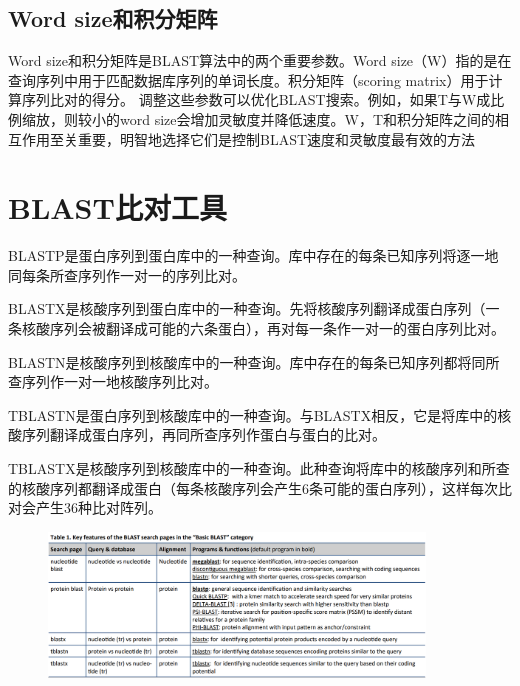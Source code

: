 \subsection{Word size和积分矩阵}
Word size和积分矩阵是BLAST算法中的两个重要参数。Word size（W）指的是在查询序列中用于匹配数据库序列的单词长度。积分矩阵（scoring matrix）用于计算序列比对的得分。
调整这些参数可以优化BLAST搜索。例如，如果T与W成比例缩放，则较小的word size会增加灵敏度并降低速度。W，T和积分矩阵之间的相互作用至关重要，明智地选择它们是控制BLAST速度和灵敏度最有效的方法

\section{BLAST比对工具}
BLASTP是蛋白序列到蛋白库中的一种查询。库中存在的每条已知序列将逐一地同每条所查序列作一对一的序列比对。\par
BLASTX是核酸序列到蛋白库中的一种查询。先将核酸序列翻译成蛋白序列（一条核酸序列会被翻译成可能的六条蛋白），再对每一条作一对一的蛋白序列比对。\par
BLASTN是核酸序列到核酸库中的一种查询。库中存在的每条已知序列都将同所查序列作一对一地核酸序列比对。\par
TBLASTN是蛋白序列到核酸库中的一种查询。与BLASTX相反，它是将库中的核酸序列翻译成蛋白序列，再同所查序列作蛋白与蛋白的比对。\par
TBLASTX是核酸序列到核酸库中的一种查询。此种查询将库中的核酸序列和所查的核酸序列都翻译成蛋白（每条核酸序列会产生6条可能的蛋白序列），这样每次比对会产生36种比对阵列。

\begin{figure}[ht]
    \centering
    \includegraphics[width=10cm]{figure/blast.PNG}
\end{figure}

